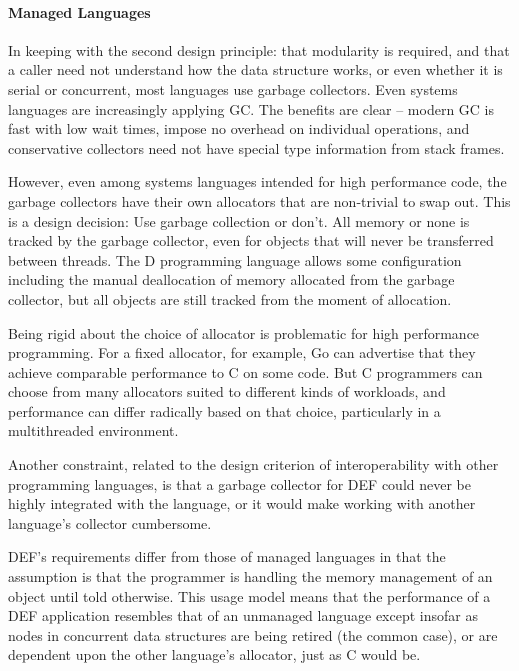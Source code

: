 \paragraph{Managed Languages} In keeping with the second design principle: that modularity is required, and that a caller need not understand how the data structure works, or even whether it is serial or concurrent, most languages use garbage collectors.  Even systems languages are increasingly applying GC.  The benefits are clear -- modern GC is fast with low wait times\cite{ShahriyarBM14}, impose no overhead on individual operations, and conservative collectors need not have special type information from stack frames.

However, even among systems languages intended for high performance code, the garbage collectors have their own allocators that are non-trivial to swap out.\cite{Go}\cite{DotNetGC}\cite{D}  This is a design decision: Use garbage collection or don't.  All memory or none is tracked by the garbage collector, even for objects that will never be transferred between threads.  The D programming language allows some configuration including the manual deallocation of memory allocated from the garbage collector, but all objects are still tracked from the moment of allocation.\cite{DPhobos}

Being rigid about the choice of allocator is problematic for high performance programming.  For a fixed allocator, for example, Go can advertise that they achieve comparable performance to C on some code.  But C programmers can choose from many allocators suited to different kinds of workloads,\cite{TCMalloc}\cite{JEMalloc}\cite{Supermalloc} and performance can differ radically based on that choice, particularly in a multithreaded environment.

Another constraint, related to the design criterion of interoperability with other programming languages, is that a garbage collector for DEF could never be highly integrated with the language, or it would make working with another language's collector cumbersome.

DEF's requirements differ from those of managed languages in that the assumption is that the programmer is handling the memory management of an object until told otherwise.  This usage model means that the performance of a DEF application resembles that of an unmanaged language except insofar as nodes in concurrent data structures are being retired (the common case), or are dependent upon the other language's allocator, just as C would be.

